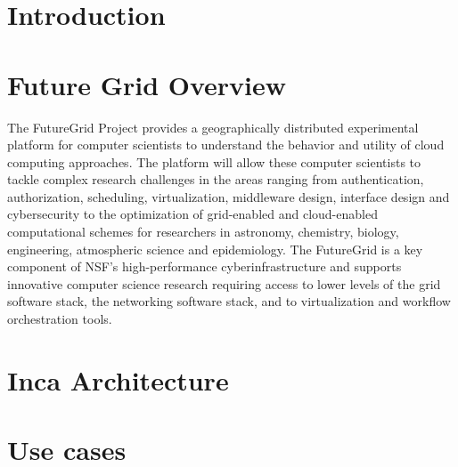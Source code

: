 \documentclass{sig-alternate}
\begin{document}
\title{}



\author{
\alignauthor
Shava Smallen, Sameer Tilak, etc. \\
 \\ 
\\ 
\\
}

\maketitle

\begin{abstract}

\end{abstract}

\section{Introduction}

\section{Future Grid Overview}

The FutureGrid Project provides a geographically distributed experimental platform for computer scientists to understand the behavior and utility of cloud computing approaches. The platform will allow these computer scientists to tackle complex research challenges in the areas ranging from authentication, authorization, scheduling, virtualization, middleware design, interface design and cybersecurity to the optimization of grid-enabled and cloud-enabled computational schemes for researchers in astronomy, chemistry, biology, engineering, atmospheric science and epidemiology. The FutureGrid is a key component of NSF's high-performance cyberinfrastructure and supports innovative computer science research requiring access to lower levels of the grid software stack, the networking software stack, and to virtualization and workflow orchestration tools.

\section{Inca Architecture}

\section{Use cases}
\end{document}
